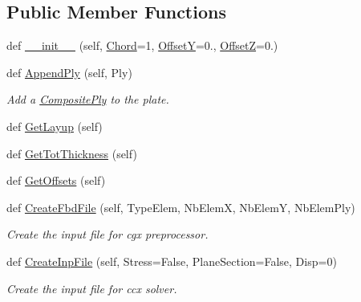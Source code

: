 \subsection*{Public Member Functions}
\begin{DoxyCompactItemize}
\item 
def \hyperlink{classgebtaero_1_1_composite_plate_1_1_composite_plate_a067ac11419d1959770398cce5de0a561}{\+\_\+\+\_\+init\+\_\+\+\_\+} (self, \hyperlink{classgebtaero_1_1_composite_plate_1_1_composite_plate_a60ae01b006e99e542c3759058e82e4cb}{Chord}=1, \hyperlink{classgebtaero_1_1_composite_plate_1_1_composite_plate_a33de8af0e1aaff88563310459b3b6f6b}{OffsetY}=0., \hyperlink{classgebtaero_1_1_composite_plate_1_1_composite_plate_aaf910e794c2f390a539b41a90dd30c83}{OffsetZ}=0.)
\item 
def \hyperlink{classgebtaero_1_1_composite_plate_1_1_composite_plate_ab41dbc2cc5c5a502f3b1d4b9bc51fbf5}{Append\+Ply} (self, Ply)
\begin{DoxyCompactList}\small\item\em Add a \hyperlink{namespacegebtaero_1_1_composite_ply}{Composite\+Ply} to the plate. \end{DoxyCompactList}\item 
def \hyperlink{classgebtaero_1_1_composite_plate_1_1_composite_plate_a37b3c4c3dc5cd919ccfc06828448911b}{Get\+Layup} (self)
\item 
def \hyperlink{classgebtaero_1_1_composite_plate_1_1_composite_plate_a093864b1001bc131f474adbd543390c6}{Get\+Tot\+Thickness} (self)
\item 
def \hyperlink{classgebtaero_1_1_composite_plate_1_1_composite_plate_a179bd2f7f860afe99ab99e928fa12d11}{Get\+Offsets} (self)
\item 
def \hyperlink{classgebtaero_1_1_composite_plate_1_1_composite_plate_a4225c3b5b70c5e76260434da2403e77d}{Create\+Fbd\+File} (self, Type\+Elem, Nb\+ElemX, Nb\+ElemY, Nb\+Elem\+Ply)
\begin{DoxyCompactList}\small\item\em Create the input file for cgx preprocessor. \end{DoxyCompactList}\item 
def \hyperlink{classgebtaero_1_1_composite_plate_1_1_composite_plate_ab2aef5a02f71d8f508d4a8f1684295fd}{Create\+Inp\+File} (self, Stress=False, Plane\+Section=False, Disp=0)
\begin{DoxyCompactList}\small\item\em Create the input file for ccx solver. \end{DoxyCompactList}\item 

\end{DoxyCompactItemize}
